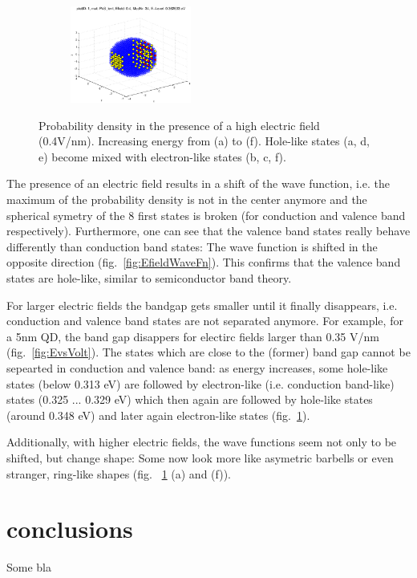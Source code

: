 \begin{figure}
\begin{subfigure}{150px}
		\caption{}
	\end{subfigure}
	\begin{subfigure}{150px}
		\includegraphics[width=150px]{Fig/Plots/r25v04Mod34}
		\caption{}
	\end{subfigure}
	\caption{Probability density in the presence of a high electric field (0.4V/nm). Increasing energy from (a) to (f). Hole-like states (a, d, e) become mixed with electron-like states (b, c, f).}
	\label{fig:HighEfieldWaveFn}
\end{figure}
%
	The presence of an electric field results in a shift of the wave function, i.e. the maximum of the probability density is not in the center anymore and the spherical symetry of the 8 first states is broken (for conduction and valence band respectively). Furthermore, one can see that the valence band states really behave differently than conduction band states: The wave function is shifted in the opposite direction (fig.~\ref{fig:EfieldWaveFn}). This confirms that the valence band states are hole-like, similar to semiconductor band theory. 
	
	For larger electric fields the bandgap gets smaller until it finally disappears, i.e. conduction and valence band states are not separated anymore. For example, for a 5nm  QD, the band gap disappers for electirc fields larger than 0.35 V/nm (fig.~\ref{fig:EvsVolt}). The states which are close to the (former) band gap cannot be sepearted in conduction and valence band: as energy increases, some hole-like states (below 0.313 eV) are followed by electron-like (i.e. conduction band-like) states (0.325 ... 0.329 eV) which then again are followed by hole-like states (around 0.348 eV) and later again electron-like states (fig.~\ref{fig:HighEfieldWaveFn}).
	
	Additionally, with higher electric fields, the wave functions seem not only to be shifted, but change shape: Some now look more like asymetric barbells or even stranger, ring-like shapes (fig. ~\ref{fig:HighEfieldWaveFn} (a) and (f)).

\FloatBarrier
\section{conclusions}
Some bla